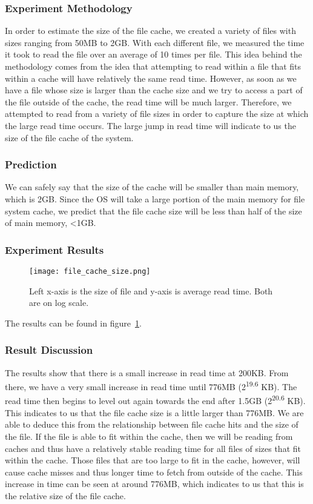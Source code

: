 \documentclass{article} %
\begin{document}
\subsubsection{Experiment Methodology}
In order to estimate the size of the file cache, we created a variety of files
with sizes ranging from 50MB to 2GB\@. With each different file, we measured the
time it took to read the file over an average of 10 times per file. This idea
behind the methodology comes from the idea that attempting to read within a
file that fits within a cache will have relatively the same read time. However,
as soon as we have a file whose size is larger than the cache size and we try
to access a part of the file outside of the cache, the read time will be much
larger. Therefore, we attempted to read from a variety of file sizes in order
to capture the size at which the large read time occurs. The large jump in read
time will indicate to us the size of the file cache of the system.

\subsubsection{Prediction}
We can safely say that the size of the cache will be smaller than main memory,
which is 2GB\@. Since the OS will take a large portion of the main memory for
file system cache, we predict that the file cache size will be less than half
of the size of main memory, <1GB.

\subsubsection{Experiment Results}

\begin{figure}[!htb]
  \centering
  \texttt{[image: file\_cache\_size.png]}
  \caption{Left x-axis is the size of file and y-axis is average read time. Both are on log scale.}
  \label{fig:file_cache_size}
\end{figure}

The results can be found in figure~\ref{fig:file_cache_size}.

\subsubsection{Result Discussion}
The results show that there is a small increase in read time at 200KB\@. From
there, we have a very small increase in read time until 776MB
(2\textsuperscript{19.6} KB). The read time then begins to level out again
towards the end after 1.5GB (2\textsuperscript{20.6} KB). This indicates to us
that the file cache size is a little larger than 776MB\@. We are able to deduce
this from the relationship between file cache hits and the size of the file. If
the file is able to fit within the cache, then we will be reading from caches
and thus have a relatively stable reading time for all files of sizes that fit
within the cache. Those files that are too large to fit in the cache, however,
will cause cache misses and thus longer time to fetch from outside of the
cache. This increase in time can be seen at around 776MB, which indicates to us
that this is the relative size of the file cache.
\end{document}
